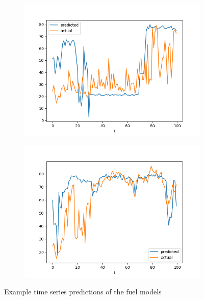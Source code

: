 \documentclass[runningheads]{llncs}
\begin{document}
\begin{figure}[hp]
\begin{subfigure}{\figwidth}
                \includegraphics[width=\textwidth]{results/evaluation/f_model_graph_p90.png}
        \end{subfigure}
        \begin{subfigure}{\figwidth}
                \includegraphics[width=\textwidth]{results/evaluation/f_model_graph_p100.png}
        \end{subfigure}
        \caption{Example time series predictions of the fuel models}
        \label{fig:fuel-prediction-examples}
    \end{figure}
\end{document}
